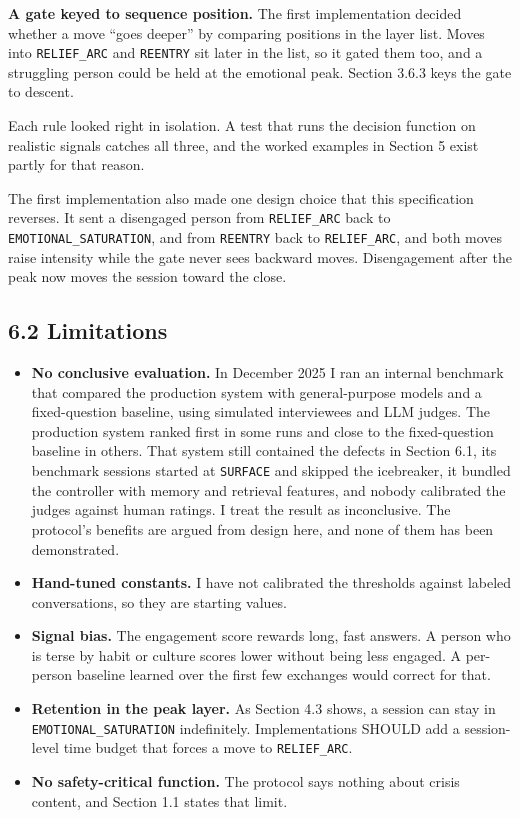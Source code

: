 \documentclass[11pt]{article}
\providecommand{\tightlist}{\setlength{\itemsep}{0pt}\setlength{\parskip}{0pt}}
\begin{document}
\textbf{A gate keyed to sequence position.} The first implementation
decided whether a move ``goes deeper'' by comparing positions in the
layer list. Moves into \texttt{RELIEF\_\allowbreak{}ARC} and \texttt{REENTRY} sit
later in the list, so it gated them too, and a struggling person could
be held at the emotional peak. Section 3.6.3 keys the gate to descent.

Each rule looked right in isolation. A test that runs the decision
function on realistic signals catches all three, and the worked examples
in Section 5 exist partly for that reason.

The first implementation also made one design choice that this
specification reverses. It sent a disengaged person from
\texttt{RELIEF\_\allowbreak{}ARC} back to \texttt{EMOTIONAL\_\allowbreak{}SATURATION}, and from
\texttt{REENTRY} back to \texttt{RELIEF\_\allowbreak{}ARC}, and both moves raise
intensity while the gate never sees backward moves. Disengagement after
the peak now moves the session toward the close.

\subsection{6.2 Limitations}

\begin{itemize}
\tightlist
\item
  \textbf{No conclusive evaluation.} In December 2025 I ran an internal
  benchmark that compared the production system with general-purpose
  models and a fixed-question baseline, using simulated interviewees and
  LLM judges. The production system ranked first in some runs and close
  to the fixed-question baseline in others. That system still contained
  the defects in Section 6.1, its benchmark sessions started at
  \texttt{SURFACE} and skipped the icebreaker, it bundled the controller
  with memory and retrieval features, and nobody calibrated the judges
  against human ratings. I treat the result as inconclusive. The
  protocol's benefits are argued from design here, and none of them has
  been demonstrated.
\item
  \textbf{Hand-tuned constants.} I have not calibrated the thresholds
  against labeled conversations, so they are starting values.
\item
  \textbf{Signal bias.} The engagement score rewards long, fast answers.
  A person who is terse by habit or culture scores lower without being
  less engaged. A per-person baseline learned over the first few
  exchanges would correct for that.
\item
  \textbf{Retention in the peak layer.} As Section 4.3 shows, a session
  can stay in \texttt{EMOTIONAL\_\allowbreak{}SATURATION} indefinitely.
  Implementations SHOULD add a session-level time budget that forces a
  move to \texttt{RELIEF\_\allowbreak{}ARC}.
\item
  \textbf{No safety-critical function.} The protocol says nothing about
  crisis content, and Section 1.1 states that limit.
\end{itemize}
\end{document}
